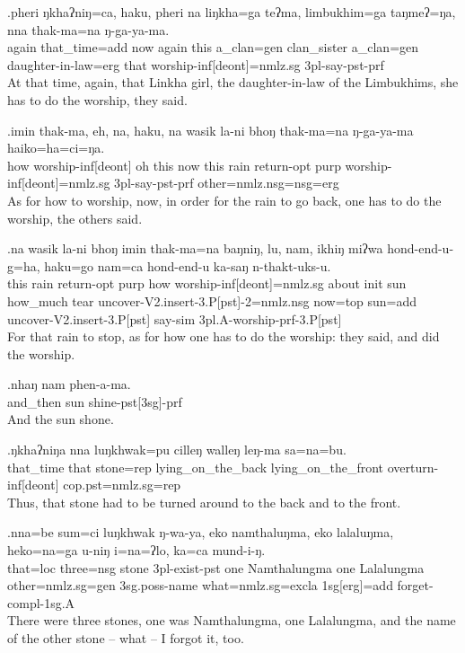 \exg.pheri ŋkhaʔniŋ=ca,  haku, pheri na liŋkha=ga  teʔma, limbukhim=ga  taŋmeʔ=ŋa, nna  thak-ma=na   ŋ-ga-ya-ma.\\
again that\_time{\sc =add} now again this a\_clan{\sc =gen} clan\_sister a\_clan{\sc =gen} daughter-in-law{\sc =erg} that worship{\sc -inf[deont]=nmlz.sg} {\sc 3pl-}say{\sc -pst-prf}\\
At that time, again, that Linkha girl, the daughter-in-law of the Limbukhims, she has to do the worship, they said.

\exg.imin thak-ma,   eh,  na,  haku, na wasik la-ni  bhoŋ thak-ma=na   ŋ-ga-ya-ma   haiko=ha=ci=ŋa.\\
how  worship{\sc -inf[deont]} oh this now this rain  return{\sc -opt} {\sc purp} worship{\sc -inf[deont]=nmlz.sg} {\sc 3pl-}say{\sc -pst-prf} other{\sc =nmlz.nsg=nsg=erg}\\
As for how to worship, now, in order for the rain to go back, one has to do the worship, the others said.

\exg.na wasik la-ni  bhoŋ imin thak-ma=na   baŋniŋ, lu, nam, ikhiŋ miʔwa hond-end-u-g=ha,    haku=go nam=ca  hond-end-u    ka-saŋ n-thakt-uks-u.\\
this rain  return{\sc -opt} purp  how  worship{\sc -inf[deont]=nmlz.sg} about  {\sc init} sun  how\_much tear uncover{\sc -V2.insert-3.P[pst]-2=nmlz.nsg} now{\sc =top}  sun{\sc =add} uncover{\sc -V2.insert-3.P[pst]} say{\sc -sim} {\sc 3pl.A-}worship{\sc -prf-3.P[pst]}\\
For that rain to stop, as for how one has to do the worship:  they said, and did the worship.

\exg.nhaŋ  nam phen-a-ma.\\
and\_then sun shine{\sc -pst[3sg]-prf}\\
And the sun shone.

\exg.ŋkhaʔniŋa nna  luŋkhwak=pu cilleŋ   walleŋ  leŋ-ma   sa=na=bu.\\
that\_time  that stone{\sc =rep}  lying\_on\_the\_back lying\_on\_the\_front overturn{\sc -inf[deont]} {\sc cop.pst=nmlz.sg=rep}\\
Thus, that stone had to be turned around to the back and to the front. 

\exg.nna=be sum=ci luŋkhwak ŋ-wa-ya,   eko namthaluŋma, eko lalaluŋma, heko=na=ga  u-niŋ  i=na=ʔlo,   ka=ca  mund-i-ŋ.\\
that{\sc =loc} three{\sc =nsg} stone {\sc 3pl-}exist{\sc -pst} one Namthalungma one Lalalungma other{\sc =nmlz.sg=gen} {\sc 3sg.poss-}name what{\sc =nmlz.sg=excla} {\sc 1sg[erg]=add} forget{\sc -compl-1sg.A}\\
There were three stones, one was Namthalungma, one Lalalungma, and the name of the other stone -- what -- I forgot it, too.

